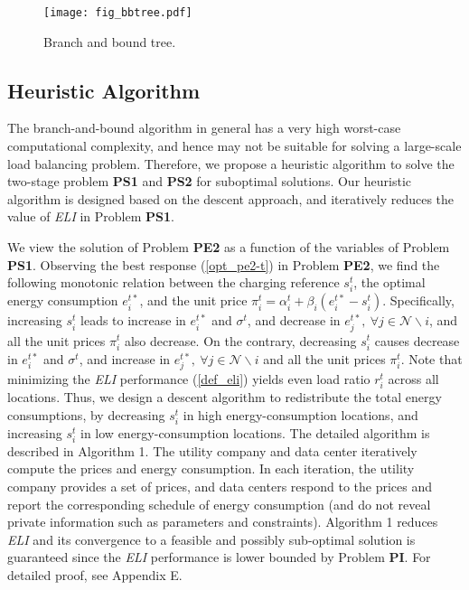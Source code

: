 \documentclass[journal]{IEEEtran}
\begin{document}
	\begin{figure}[t]
		\centering
		\texttt{[image: fig\_bbtree.pdf]}
		\caption{\label{fig_bbtree}Branch and bound tree.}
\end{figure}
	
	
	\subsection{Heuristic Algorithm}
	The branch-and-bound algorithm in general has a very high worst-case computational complexity, and hence may not be suitable for solving a large-scale load balancing problem. Therefore, we propose a heuristic algorithm to solve the two-stage problem \textbf{PS1} and \textbf{PS2} for suboptimal solutions. Our heuristic algorithm is designed based on the descent approach, and iteratively reduces the value of \emph{ELI} in Problem \textbf{PS1}.
	
	We view the solution of Problem \textbf{PE2} as a function of the variables of Problem \textbf{PS1}. Observing the best response (\ref{opt_pe2-t}) in Problem \textbf{PE2}, we find the following monotonic relation between the charging reference $s_i^t$, the optimal energy consumption $e_i^{t \ast}$, and the unit price $\pi_i^t = \alpha_i^t + \beta_i (e_i^{t \ast} - s_i^t)$. Specifically, increasing $s_i^t$ leads to increase in $e_i^{t \ast}$ and $\sigma^t$, and decrease in $e_j^{t \ast},~\forall j \in \mathcal{N} \backslash i$, and all the unit prices $\pi_i^t$ also decrease. On the contrary, decreasing $s_i^t$ causes decrease in $e_i^{t \ast}$ and $\sigma^t$, and increase in $e_j^{t \ast},~\forall j \in \mathcal{N} \backslash i$ and all the unit prices $\pi_i^t$. Note that minimizing the \emph{ELI} performance (\ref{def_eli}) yields even load ratio $r_i^t$ across all locations. Thus, we design a descent algorithm to redistribute the total energy consumptions, by decreasing $s_i^t$ in high energy-consumption locations, and increasing $s_i^t$ in low energy-consumption locations. The detailed algorithm is described in Algorithm 1. The utility company and data center iteratively compute the prices and energy consumption. In each iteration, the utility company provides a set of prices, and data centers respond to the prices and report the corresponding schedule of energy consumption (and do not reveal private information such as parameters and constraints). Algorithm 1 reduces \emph{ELI} and its convergence to a feasible and possibly sub-optimal solution is guaranteed since the \emph{ELI} performance is lower bounded by Problem \textbf{PI}. For detailed proof, see Appendix E.
	
\end{document}
